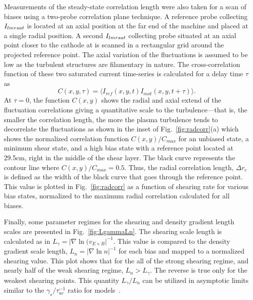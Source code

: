 \documentclass[aip,pop,amsmath,amssymb,preprint,superscriptaddress]{revtex4-1} %
\begin{document}
Measurements of the steady-state correlation length were also taken for a scan of biases using a two-probe correlation plane technique. A reference probe collecting $I_{\rmdefault sat}$ is located at an axial position at the far end of the machine and placed at a single radial position. A second $I_{\rmdefault sat}$ collecting probe situated at an axial point closer to the cathode at is scanned in a rectangular grid around the projected reference point. The axial variation of the fluctuations is assumed to be low as the turbulent structures are filamentary in nature. The cross-correlation function of these two saturated current time-series is calculated for a delay time $\tau$ as
%
\begin{equation}
C(x,y,\tau) = \langle I_{ref}(x,y,t)I_{mot}(x,y,t+\tau)\rangle.
\label{eq:time_correlation}
\end{equation}
%
At $\tau = 0$, the function $C(x,y)$ shows the radial and axial extend of the fluctuation correlations giving a quantitative scale to the turbulence---that is, the smaller the correlation length, the more the plasma turbulence tends to decorrelate the fluctuations as shown in the inset of Fig.~\ref{fig:radcorr}(a) which shows the normalized correlation function $C(x,y)/C_{max}$ for an unbiased state, a minimum shear state, and a high bias state with a reference point located at 29.5cm, right in the middle of the shear layer. The black curve represents the contour line where $C(x,y)/C_{max} = 0.5$. Thus, the radial correlation length, $\Delta r_{c}$ is defined as the width of the black curve that goes through the reference point. This value is plotted in Fig.~\ref{fig:radcorr} as a function of shearing rate for various bias states, normalized to the maximum radial correlation calculated for all biases.

Finally, some parameter regimes for the shearing and density gradient length scales are presented in Fig.~\ref{fig:LgammaLn}. The shearing scale length is calculated as in $L_{\gamma} = |\nabla \ln(v_{E\times B}|^{-1}.$ This value is compared to the density gradient scale length, $L_{n} = |\nabla \ln{n}|^{-1}$ for each bias and mapped to a normalized shearing value. This plot shows that for the all of the strong shearing regime, and nearly half of the weak shearing regime, $L_{n} > L_{\gamma}$. The reverse is true only for the weakest shearing points. This quantity $L_{\gamma}/L_{n}$ can be utilized in asymptotic limits similar to the $\gamma_{s}/\tau_{ac}^{-1}$ ratio for models~\cite{leconte06}.
\end{document}
